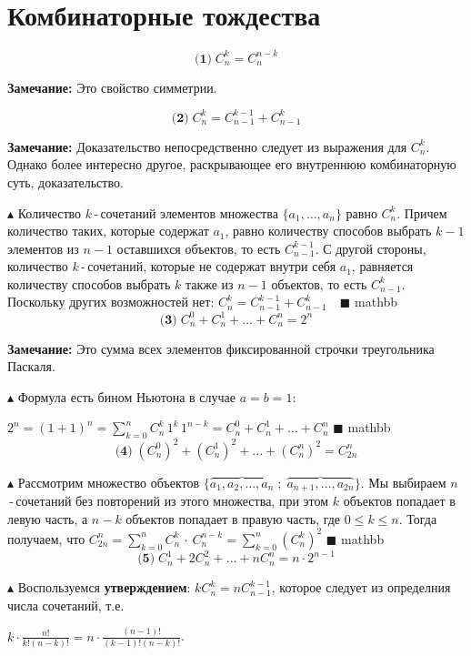 \setcounter{section}{30}

\section{Комбинаторные тождества}

$$\textbf{(1)} \; C_n^k = C_n^{n-k}$$

\textbf{Замечание:} Это свойство симметрии.

$$\textbf{(2)} \; C_n^k = C_{n-1}^{k-1} + C_{n-1}^{k}$$

\textbf{Замечание:} Доказательство непосредственно следует из выражения для $C_n^k$. Однако более интересно другое, раскрывающее его внутреннюю комбинаторную суть, доказательство.

$\blacktriangle$ Количество $k$\,-\,сочетаний элементов множества $\{a_1,\ldots,a_n\}$ равно $C_n^k$. Причем количество таких, которые содержат $a_1$, равно количеству способов выбрать $k-1$ элементов из $n-1$ оставшихся объектов, то есть $C_{n-1}^{k-1}$. С другой стороны, количество $k$\,-\,сочетаний, которые не содержат внутри себя $a_1$, равняется количеству способов выбрать $k$ также из $n-1$ объектов, то есть $C_{n-1}^{k}$. Поскольку других возможностей нет:
$C_n^k = C_{n-1}^{k-1} + C_{n-1}^{k} \quad \blacksquare$
mathbb $$\textbf{(3)} \; C_n^0 + C_n^1 + \ldots + C_n^n = 2^n$$

\textbf{Замечание:} Это сумма всех элементов фиксированной строчки треугольника Паскаля.

$\blacktriangle$ Формула есть бином Ньютона в случае $a=b=1$: 

$2^n = (1 + 1) ^ n = \sum_{k=0}^nC_n^k\,1^k\,1^{n-k} = C_n^0 + C_n^1 + \ldots + C_n^n$ \quad $\blacksquare$
mathbb $$\textbf{(4)} \; (C_n^0)^2 + (C_n^1)^2 + \ldots + (C_n^n)^2 = C_{2n}^n$$

$\blacktriangle$ Рассмотрим множество объектов $\{\overbrace{a_1, a_2, \ldots, a_n}\; ; \; \overbrace{a_{n+1}, \ldots, a_{2n}}\}$. Мы выбираем $n$\,-\,сочетаний без повторений из этого множества, при этом $k$ объектов попадает в левую часть, а $n-k$ объектов попадает в правую часть, где $0 \leq k \leq n$. Тогда получаем, что $C_{2n}^n = \sum_{k=0}^nC_n^k \,\cdot \, C_n^{n-k} = \sum_{k=0}^n(C_n^k)^2$ \quad $\blacksquare$
mathbb $$\textbf{(5)} \; C_n^1 + 2C_n^2 + \ldots + nC_n^n = n\cdot2^{n-1}$$

$\blacktriangle$ Воспользуемся \textbf{утверждением}: $kC_n^k = nC_{n-1}^{k-1}$, которое следует из определния числа сочетаний, т.е. 

$k\cdot\frac{n!}{k!(n-k)!} = n \cdot \frac{(n-1)!}{(k-1)!(n-k)!}$. 

